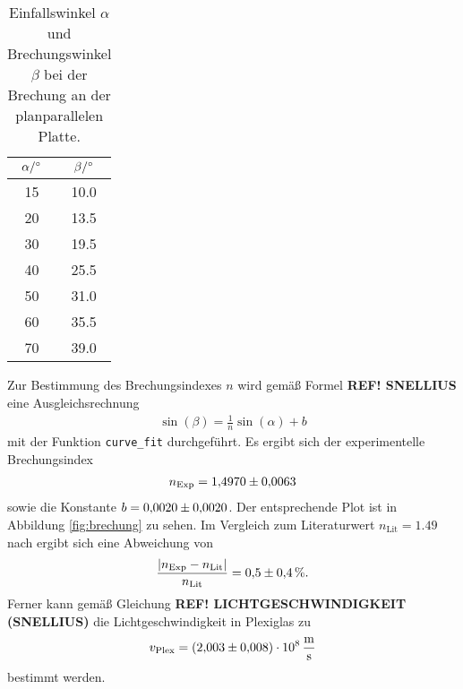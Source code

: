 \begin{table}[H]
    \centering
    \caption[short]{Einfallswinkel $\alpha$ und Brechungswinkel $\beta$ bei der Brechung an der planparallelen Platte.}
    \label{tab:brechung}
    \begin{tabular}{S S[table-format=2.1]}
        \toprule
        {$\alpha / \unit[]{\degree}$} & {$\beta / \unit[]{\degree}$} \\
        \midrule
        15 & 10.0 \\
        20 & 13.5 \\
        30 & 19.5 \\
        40 & 25.5 \\
        50 & 31.0 \\
        60 & 35.5 \\
        70 & 39.0 \\
        \bottomrule
    \end{tabular}
\end{table}


Zur Bestimmung des Brechungsindexes $n$ wird gemäß Formel \textbf{REF! SNELLIUS} eine Ausgleichsrechnung
\begin{align}
    \sin(\beta) = \frac{1}{n} \sin(\alpha) + b
\end{align}
mit der Funktion \texttt{curve\_fit} durchgeführt.
Es ergibt sich der experimentelle Brechungsindex
\begin{align}
    n_\text{Exp} = \num[]{1.4970 +- 0.0063}
\end{align}
sowie die Konstante $b = \num[]{0.0020 +- 0.0020}$.
Der entsprechende Plot ist in Abbildung \ref{fig:brechung} zu sehen.
Im Vergleich zum Literaturwert $n_\text{Lit} = \num[]{1.49}$ nach \cite[]{brechungsindex} ergibt sich eine Abweichung von 
\begin{align}
    \frac{|n_\text{Exp} - n_\text{Lit}|}{n_\text{Lit}} = \num[]{0.5 +- 0.4} \, \%.
\end{align}
Ferner kann gemäß Gleichung \textbf{REF! LICHTGESCHWINDIGKEIT (SNELLIUS)} die Lichtgeschwindigkeit in Plexiglas zu
\begin{align}
    v_\text{Plex} = (\num[]{2.003 +- 0.008}) \cdot 10^8 \, \unit{\meter\per\second}
\end{align}
bestimmt werden.


